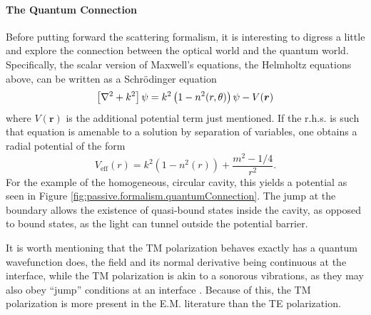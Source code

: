 \paragraph{The Quantum Connection}
Before putting forward the scattering formalism, it is interesting
to digress a little and explore the connection between the optical 
world and the quantum world. Specifically, the scalar version of
Maxwell's equations, the Helmholtz equations above, can be written 
as a Schrödinger equation
	\begin{equation}
		\left[\nabla^2+k^2\right]\psi = k^2\left(1-n^2(r,\theta)\right)\psi - V(\boldsymbol{r})
	\end{equation}
where $V(\boldsymbol{r})$  is the additional potential term just mentioned.
If the r.h.s. is such that equation is amenable to a solution by 
separation of variables, one obtains a radial potential of the form
	\begin{equation}
		V_\text{eff}(r) = k^2(1-n^2(r))+\frac{m^2-1/4}{r^2}.
	\end{equation}
For the example of the homogeneous, circular cavity, this yields a
potential as seen in Figure \ref{fig:passive.formalism.quantumConnection}. 
The jump at the boundary allows the existence of quasi-bound states inside
the cavity, as opposed to bound states, as the light can tunnel outside the
potential barrier.

It is worth mentioning that the TM polarization behaves exactly has a 
quantum wavefunction does, the field and its normal derivative being
continuous at the interface, while the TM polarization is akin to 
a sonorous vibrations, as they may also obey ``jump'' conditions
at an interface \cite{COL2013}. Because of this, the TM polarization
is more present in the E.M. literature than the TE polarization.

